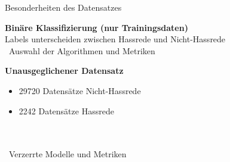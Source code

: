 \documentclass[aspectratio=169]{beamer} %
\begin{document}
\begin{frame}{Besonderheiten des Datensatzes}
    \begin{minipage}[t][0.9\textheight][t]{0.28\textwidth}
        \vspace{0.6cm} %
        \textbf{Binäre Klassifizierung (nur Trainingsdaten)}
        \vspace{0.75cm} %
        \\
        Labels unterscheiden zwischen Hassrede und Nicht-Hassrede
        \\
        [1.45cm]
        \textrightarrow\ Auswahl der Algorithmen und Metriken 
    \end{minipage}
    \hspace{0.5cm}
    \begin{minipage}[t][0.9\textheight][t]{0.28\textwidth}
        \vspace{0.6cm} %
        \textbf{Unausgeglichener Datensatz}
        \vspace{0.35cm} %
        \begin{itemize}[label=\textbullet]
            \item 29720 Datensätze Nicht-Hassrede
            \item 2242 Datensätze Hassrede 
        \end{itemize}
        \\[1cm]
        \vspace{1cm}
        \\
        \textrightarrow\ Verzerrte Modelle und Metriken
    \end{minipage}
    \hspace{0.5cm}
\end{frame}
\end{document}
